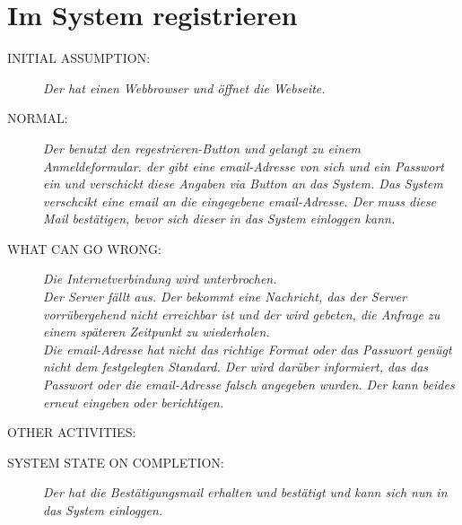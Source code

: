 \section{Im System registrieren}
\begin{description}
  \item [INITIAL ASSUMPTION:]
    \textit{Der   hat einen Webbrowser und öffnet die Webseite.}
  \item [NORMAL:]
    \textit{Der  benutzt den regestrieren-Button und gelangt zu einem Anmeldeformular. der  gibt eine email-Adresse von sich und ein Passwort ein und verschickt diese Angaben via Button an das System. Das System verschcikt eine email an die eingegebene email-Adresse. Der  muss diese Mail bestätigen, bevor sich dieser in das System einloggen kann. }
  \item [WHAT CAN GO WRONG:]
    \textit{Die Internetverbindung wird unterbrochen.\\
Der Server fällt aus. Der  bekommt eine Nachricht, das der Server vorrübergehend nicht erreichbar ist und der  wird gebeten, die Anfrage zu einem späteren Zeitpunkt zu wiederholen.\\
Die email-Adresse hat nicht das richtige Format oder das Passwort genügt nicht dem festgelegten Standard. Der  wird darüber informiert, das das Passwort oder die email-Adresse falsch angegeben wurden. Der  kann beides erneut eingeben oder berichtigen.
}
  \item [OTHER ACTIVITIES:]
    \textit{}
  \item [SYSTEM STATE ON COMPLETION:]
    \textit{Der  hat die Bestätigungsmail erhalten und bestätigt und kann sich nun in das System einloggen.}
\end{description}

